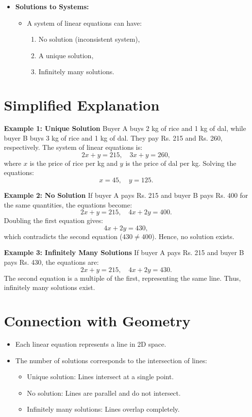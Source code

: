 \documentclass{article}
\begin{document}
\begin{itemize}
  \item \textbf{Solutions to Systems:}
    \begin{itemize}
      \item A system of linear equations can have:
        \begin{enumerate}
          \item No solution (inconsistent system),
          \item A unique solution,
          \item Infinitely many solutions.
        \end{enumerate}
    \end{itemize}
\end{itemize}

\section*{Simplified Explanation}

\textbf{Example 1: Unique Solution}
Buyer A buys 2 kg of rice and 1 kg of dal, while buyer B buys 3 kg of rice and 1 kg of dal. They pay Rs. 215 and Rs. 260, respectively.
The system of linear equations is:
\[
  2x + y = 215, \quad 3x + y = 260,
\]
where $x$ is the price of rice per kg and $y$ is the price of dal per kg.
Solving the equations:
\[
  x = 45, \quad y = 125.
\]

\textbf{Example 2: No Solution}
If buyer A pays Rs. 215 and buyer B pays Rs. 400 for the same quantities, the equations become:
\[
  2x + y = 215, \quad 4x + 2y = 400.
\]
Doubling the first equation gives:
\[
  4x + 2y = 430,
\]
which contradicts the second equation ($430 \neq 400$). Hence, no solution exists.

\textbf{Example 3: Infinitely Many Solutions}
If buyer A pays Rs. 215 and buyer B pays Rs. 430, the equations are:
\[
  2x + y = 215, \quad 4x + 2y = 430.
\]
The second equation is a multiple of the first, representing the same line. Thus, infinitely many solutions exist.

\section*{Connection with Geometry}

\begin{itemize}
  \item Each linear equation represents a line in 2D space.
  \item The number of solutions corresponds to the intersection of lines:
    \begin{itemize}
      \item Unique solution: Lines intersect at a single point.
      \item No solution: Lines are parallel and do not intersect.
      \item Infinitely many solutions: Lines overlap completely.
    \end{itemize}
\end{itemize}
\end{document}
